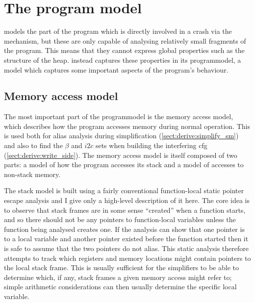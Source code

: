 \section{The program model}
\label{sect:program_model}


{\Technique} models the part of the program which is directly involved
in a crash via the {\StateMachine} mechanism, but these are only
capable of analysing relatively small fragments of the program.  This
means that they cannot express global properties such as the structure
of the heap.  {\Technique} instead captures these properties in its
\gls{programmodel}, a model which captures some important aspects of
the program's behaviour.


\subsection{Memory access model}
\label{sect:program_model:dynamic_alias}

The most important part of the \gls{programmodel} is the memory access
model, which describes how the program accesses memory during normal
operation.  This is used both for alias analysis during
{\StateMachine} simplification (\autoref{sect:derive:simplify_sm}) and
also to find the $\beta$ and $i2c$ sets when building the interfering
\gls{cfg} (\autoref{sect:derive:write_side}).  The memory access model
is itself composed of two parts: a model of how the program accesses
its stack and a model of accesses to non-stack memory.

The stack model is built using a fairly conventional function-local
static pointer escape analysis\needCite{} and I give only a high-level
description of it here.  The core idea is to observe that stack frames
are in some sense ``created'' when a function starts, and so there
should not be any pointers to function-local variables unless the
function being analysed creates one.  If the analysis can show that
one pointer is to a local variable and another pointer existed before
the function started then it is safe to assume that the two pointers
do not alias.  This static analysis therefore attempts to track which
registers and memory locations might contain pointers to the local
stack frame.  This is usually sufficient for the {\StateMachine}
simplifiers to be able to determine which, if any, stack frames a
given memory access might refer to; simple arithmetic considerations
can then usually determine the specific local variable.

